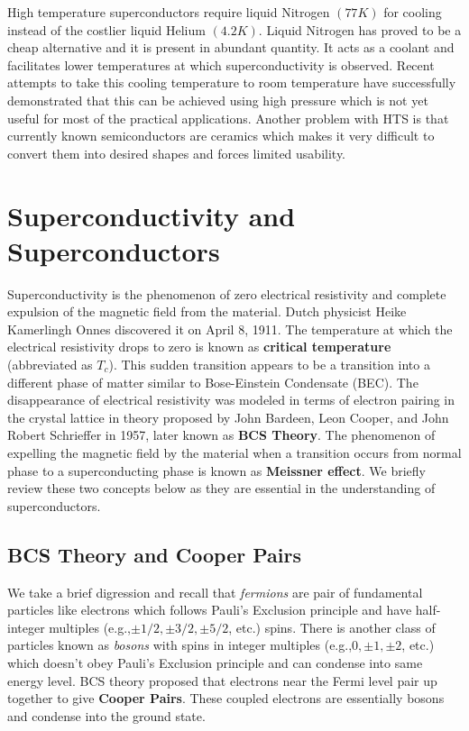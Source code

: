 \documentclass{article}
\begin{document}
	High temperature superconductors require liquid Nitrogen $(77 K)$ for cooling instead of the costlier liquid Helium $(4.2 K)$. Liquid Nitrogen has proved to be a cheap alternative and it is present in abundant quantity. It acts as a coolant and facilitates lower temperatures at which superconductivity is observed. Recent attempts to take this cooling temperature to room temperature have successfully demonstrated that this can be achieved using high pressure which is not yet useful for most of the practical applications. Another problem with HTS is that currently known semiconductors are ceramics which makes it very difficult to convert them into desired shapes and forces limited usability.
	
	
	
	\section{Superconductivity and Superconductors}
	\label{sec:headings}
	Superconductivity is the phenomenon of zero electrical resistivity and complete expulsion of the magnetic field from the material. Dutch physicist Heike Kamerlingh Onnes discovered it on April 8, 1911. The temperature at which the electrical resistivity drops to zero is known as \textbf{critical temperature} (abbreviated as $T_c$). This sudden transition appears to be a transition into a different phase of matter similar to Bose-Einstein Condensate (BEC). The disappearance of electrical resistivity was modeled in terms of electron pairing in the crystal lattice in theory proposed by John Bardeen, Leon Cooper, and John Robert Schrieffer in 1957, later known as \textbf{BCS Theory}. The phenomenon of expelling the magnetic field by the material when a transition occurs from normal phase to a superconducting phase is known as \textbf{Meissner effect}. We briefly review these two concepts below as they are essential in the understanding of superconductors.
	
	\subsection{BCS Theory and Cooper Pairs}
	We take a brief digression and recall that \textit{fermions} are pair of fundamental particles like electrons which follows Pauli's Exclusion principle and have half-integer multiples (e.g.,$ \pm 1/2, \pm 3/2, \pm 5/2 $, etc.) spins. There is another class of particles known as \textit{bosons} with spins in integer multiples (e.g.,$ 0, \pm 1, \pm 2$, etc.) which doesn't obey Pauli's Exclusion principle and can condense into same energy level. BCS theory proposed that electrons near the Fermi level pair up together to give \textbf{Cooper Pairs}. These coupled electrons are essentially bosons and condense into the ground state.  
	
\end{document}
